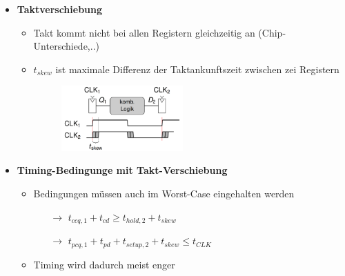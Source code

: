 \documentclass[11pt,a4paper]{article}
\begin{document}
\begin{itemize}
\pagebreak	
	
\item \textbf{Taktverschiebung}
	\begin{itemize}
	\item Takt kommt nicht bei allen Registern gleichzeitig an (Chip-Unterschiede,..)
	\item $t_{skew}$ ist maximale Differenz der Taktankunftszeit zwischen zei Registern
	\item[] \begin{figure}[H]
				\begin{center}
				\includegraphics[height=2.5cm]{tskew}
				\end{center}
			\end{figure}
	\end{itemize}
	
\item \textbf{Timing-Bedingunge mit Takt-Verschiebung}
	\begin{itemize}
	\item Bedingungen müssen auch im Worst-Case eingehalten werden
		\begin{itemize}
		\item[$\rightarrow$] $t_{ccq,1}+t_{cd} \geq t_{hold,2} + t_{skew}$
		\item[$\rightarrow$] $t_{pcq,1}+t_{pd} + t_{setup,2} + t_{skew} \leq t_{CLK}$
		\end{itemize}
	
	\item Timing wird dadurch meist enger
	\end{itemize}
	

\end{itemize}
\end{document}
